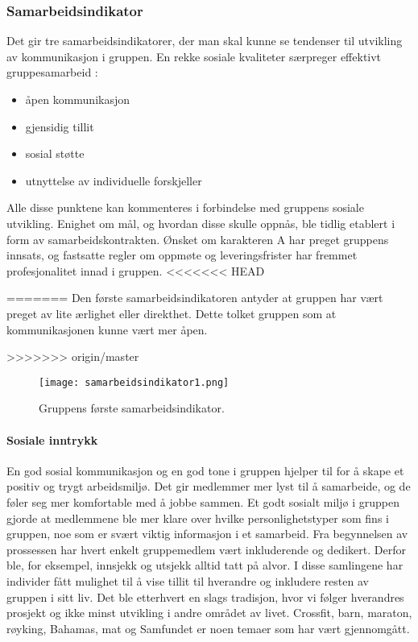 \subsubsection{Samarbeidsindikator}

Det gir tre samarbeidsindikatorer, der man skal kunne se tendenser til utvikling av kommunikasjon i gruppen.
En rekke sosiale kvaliteter særpreger effektivt gruppesamarbeid \cite{orgorg}:

\begin{itemize}
	\item åpen kommunikasjon
	\item gjensidig tillit
	\item sosial støtte
	\item utnyttelse av individuelle forskjeller
\end{itemize}

Alle disse punktene kan kommenteres i forbindelse med gruppens sosiale utvikling.
Enighet om mål, og hvordan disse skulle oppnås, ble tidlig etablert i form av samarbeidskontrakten.
Ønsket om karakteren A har preget gruppens innsats, og fastsatte regler om oppmøte og leveringsfrister har fremmet profesjonalitet innad i gruppen.
<<<<<<< HEAD

=======
Den første samarbeidsindikatoren antyder at gruppen har vært preget av lite ærlighet eller direkthet.
Dette tolket gruppen som at kommunikasjonen kunne vært mer åpen.

>>>>>>> origin/master
\begin{figure}[h!]
	\begin{center}
		\caption{Gruppens første samarbeidsindikator.}
		\label{fig:samarbeidsindikator}
		\texttt{[image: samarbeidsindikator1.png]}
	\end{center}
\end{figure}

\paragraph{Sosiale inntrykk}
En god sosial kommunikasjon og en god tone i gruppen hjelper til for å skape et positiv og trygt arbeidsmiljø.
Det gir medlemmer mer lyst til å samarbeide, og de føler seg mer komfortable med å jobbe sammen.
Et godt sosialt miljø i gruppen gjorde at medlemmene ble mer klare over hvilke personlighetstyper som fins i gruppen, noe som er svært viktig informasjon i et samarbeid.
Fra begynnelsen av prossessen har hvert enkelt gruppemedlem vært inkluderende og dedikert. 
Derfor ble, for eksempel, innsjekk og utsjekk alltid tatt på alvor.
I disse samlingene har individer fått mulighet til å vise tillit til hverandre og inkludere resten av gruppen i sitt liv. 
Det ble etterhvert en slags tradisjon, hvor vi følger hverandres prosjekt og ikke minst utvikling i andre området av livet.
Crossfit, barn, maraton, røyking, Bahamas, mat og Samfundet er noen temaer som har vært gjennomgått. \\

